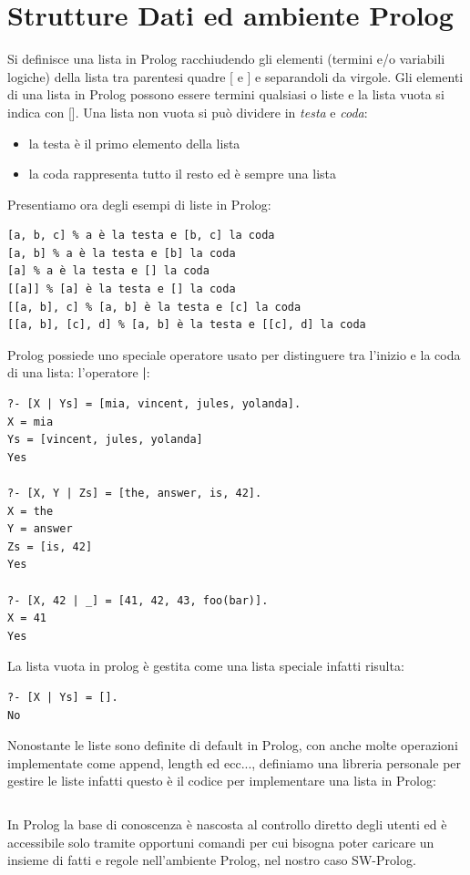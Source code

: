 \section{Strutture Dati ed ambiente Prolog}
Si definisce una lista in Prolog racchiudendo gli elementi (termini e/o variabili logiche) della lista tra parentesi quadre [ e ]
e separandoli da virgole.\newline
Gli elementi di una lista in Prolog possono essere termini qualsiasi o liste e la lista vuota si indica con [].\newline
Una lista non vuota si può dividere in \textit{testa} e \textit{coda}:
\begin{itemize}
\item la testa è il primo elemento della lista
\item la coda rappresenta tutto il resto ed è sempre una lista
\end{itemize}
Presentiamo ora degli esempi di liste in Prolog:
\begin{verbatim}
[a, b, c] % a è la testa e [b, c] la coda
[a, b] % a è la testa e [b] la coda
[a] % a è la testa e [] la coda
[[a]] % [a] è la testa e [] la coda
[[a, b], c] % [a, b] è la testa e [c] la coda
[[a, b], [c], d] % [a, b] è la testa e [[c], d] la coda
\end{verbatim}
Prolog possiede uno speciale operatore usato per distinguere tra l'inizio e la coda di una lista: l'operatore \textbf{|}:
\begin{verbatim}
?- [X | Ys] = [mia, vincent, jules, yolanda].
X = mia
Ys = [vincent, jules, yolanda]
Yes

?- [X, Y | Zs] = [the, answer, is, 42].
X = the
Y = answer
Zs = [is, 42]
Yes

?- [X, 42 | _] = [41, 42, 43, foo(bar)].
X = 41
Yes
\end{verbatim}
La lista vuota in prolog è gestita come una lista speciale infatti risulta:
\begin{verbatim}
?- [X | Ys] = [].
No
\end{verbatim}
Nonostante le liste sono definite di default in Prolog, con anche molte operazioni implementate come append, length ed ecc...,
definiamo una libreria personale per gestire le liste infatti questo è il codice per implementare una lista in Prolog:
\inputminted{Prolog}{esempi/liste.pl}
In Prolog la base di conoscenza è nascosta al controllo diretto degli utenti ed è accessibile solo tramite opportuni comandi per cui
bisogna poter caricare un insieme di fatti e regole nell'ambiente Prolog, nel nostro caso SW-Prolog.\newline
